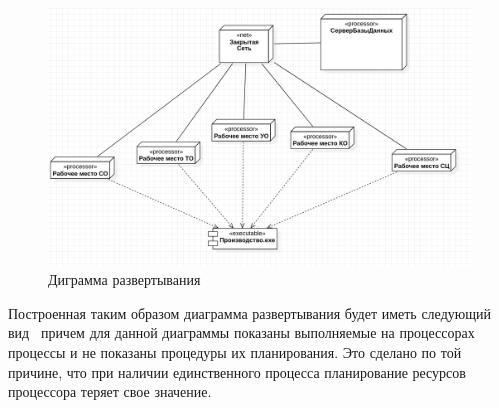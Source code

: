 \documentclass[a4paper,12pt]{extreport}
\begin{document}
\begin{figure}[h!]
	\centering
	\includegraphics[width=0.6\linewidth]{images/deployementfull}
	\caption{Диграмма развертывания}
	\label{fig:deployementfull}
\end{figure}
\normalsize
Построенная таким образом диаграмма развертывания будет иметь следующий вид \, причем для данной диаграммы показаны выполняемые на процессорах процессы и не показаны процедуры их планирования. Это сделано по той причине, что при наличии единственного процесса планирование ресурсов процессора теряет свое значение.
\vfill
\newpage\newpage
{}
\listoffigures
{}
\listoftables
\end{document}
